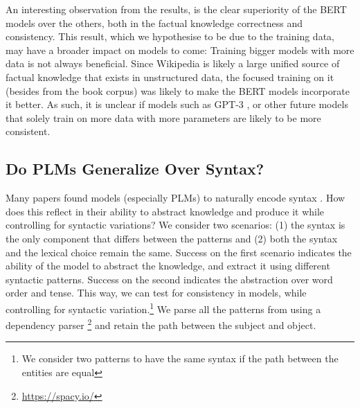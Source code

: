 

An interesting observation from the results, is the clear superiority of the BERT models over the others, both in the factual knowledge correctness and consistency. This result, which we hypothesise to be due to the training data, may have a broader impact on models to come: Training bigger models with more data is not always beneficial. Since Wikipedia is likely a large unified source of factual knowledge that exists in unstructured data, the focused training on it (besides from the book corpus) was likely to make the BERT models incorporate it better.
As such, it is unclear if models such as GPT-3 \cite{gpt3}, or other future models that solely train on more data with more parameters are likely to be more consistent.


\subsection{Do PLMs Generalize Over Syntax?} 



Many papers found models (especially PLMs) to naturally encode syntax \cite{linzen2016assessing,marvin-linzen-2018-targeted,yoav-syntax,hewitt2019structural}. How does this reflect in their ability to abstract knowledge and produce it while controlling for syntactic variations?
We consider two scenarios: (1) the syntax is the only component that differs between the patterns and (2) both the syntax and the lexical choice remain the same.
Success on the first scenario indicates the ability of the model to abstract the knowledge, and extract it using different syntactic patterns. Success on the second indicates the abstraction over word order and tense. This way, we can test for consistency in models, while controlling for syntactic variation.\footnote{We consider two patterns to have the same syntax if the path between the entities are equal} 
We parse all the patterns from \resource{} using a dependency parser \cite{spacy}\footnote{\url{https://spacy.io/}} and retain the path between the subject and object.


